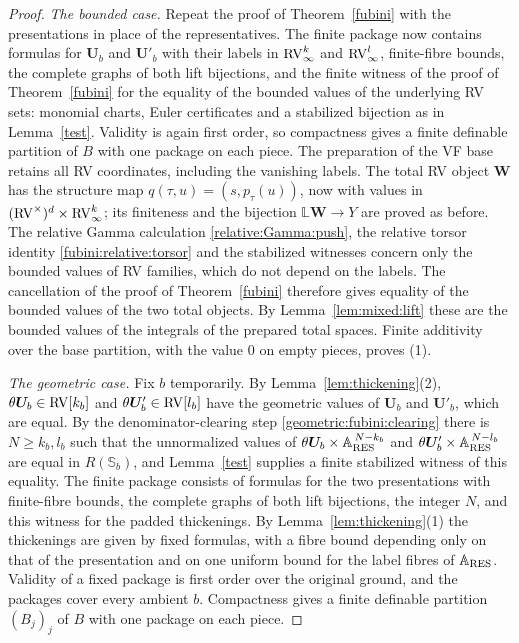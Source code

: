 \begin{proof}
\emph{The bounded case.} Repeat the proof of Theorem~\ref{fubini} with the
presentations in place of the representatives. The finite package now
contains formulas for $\bm U_b$ and $\bm U'_b$ with their labels in
$\mathrm{RV}_\infty^{k}$ and $\mathrm{RV}_\infty^{l}$, finite-fibre bounds, the complete
graphs of both lift bijections, and the finite witness of the proof of
Theorem~\ref{fubini} for the equality of the bounded values of the
underlying RV sets: monomial charts, Euler certificates and a stabilized
bijection as in Lemma~\ref{test}. Validity is again first order, so compactness gives a finite
definable partition of $B$ with one package on each piece. The preparation
of the VF base retains all RV coordinates, including the vanishing labels.
The total RV object $\bm W$ has the structure map
$q(\tau,u)=(s,p_\tau(u))$, now with values in
$(\mathrm{RV}^\times)^d\times\mathrm{RV}_\infty^k$; its finiteness and the bijection
$\mathbb L\bm W\to Y$ are proved as before. The relative Gamma calculation
\eqref{relative:Gamma:push}, the relative torsor identity
\eqref{fubini:relative:torsor} and the stabilized witnesses concern only the
bounded values of RV families, which do not depend on the labels. The
cancellation of the proof of Theorem~\ref{fubini} therefore gives equality
of the bounded values of the two total objects. By
Lemma~\ref{lem:mixed:lift} these are the bounded values of the integrals of
the prepared total spaces. Finite additivity over the base partition, with
the value $0$ on empty pieces, proves (1).

\emph{The geometric case.} Fix $b$ temporarily. By
Lemma~\ref{lem:thickening}(2), $\theta\bm U_b\in\mathrm{RV}[k_b]$ and
$\theta\bm U'_b\in\mathrm{RV}[l_b]$ have the geometric values of $\bm U_b$ and
$\bm U'_b$, which are equal. By the denominator-clearing step
\eqref{geometric:fubini:clearing} there is $N\geq k_b,l_b$ such that the
unnormalized values of
$\theta\bm U_b\times\bm{\mathbb A}_{\mathrm{RES}}^{\,N-k_b}$ and
$\theta\bm U'_b\times\bm{\mathbb A}_{\mathrm{RES}}^{\,N-l_b}$ are equal in
$R(\mathbb S_b)$, and Lemma~\ref{test} supplies a finite stabilized witness
of this equality. The finite package consists of formulas for the two
presentations with finite-fibre bounds, the complete graphs of both lift
bijections, the integer $N$, and this witness for the padded thickenings.
By Lemma~\ref{lem:thickening}(1) the thickenings are given by fixed
formulas, with a fibre bound depending only on that of the presentation and
on one uniform bound for the label fibres of $\bm{\mathbb A}_{\mathrm{RES}}$.
Validity of a fixed package is first order over the original ground, and
the packages cover every ambient $b$. Compactness gives a finite definable
partition $(B_j)_j$ of $B$ with one package on each piece.


\end{proof}
